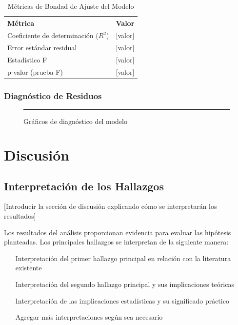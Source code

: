 \documentclass[12pt, letterpaper]{article}
\begin{document}
\begin{table}[H]
    \centering
    \caption{Métricas de Bondad de Ajuste del Modelo}
    \begin{tabular}{@{}lc@{}}
        \toprule
        \textbf{Métrica}                     & \textbf{Valor} \\
        \midrule
        Coeficiente de determinación ($R^2$) & [valor]        \\
        Error estándar residual              & [valor]        \\
        Estadístico F                        & [valor]        \\
        p-valor (prueba F)                   & [valor]        \\
        \bottomrule
    \end{tabular}
    \label{tab:bondad}
\end{table}

\subsubsection{Diagnóstico de Residuos}

\begin{figure}[H]
    \centering
    \rule{10cm}{6cm} %
    \caption{Gráficos de diagnóstico del modelo}
    \label{fig:residuos}
\end{figure}

\section{Discusión}

\subsection{Interpretación de los Hallazgos}

[Introducir la sección de discusión explicando cómo se interpretarán los resultados]

Los resultados del análisis proporcionan evidencia para evaluar las hipótesis planteadas. Los principales hallazgos se interpretan de la siguiente manera:

\begin{enumerate}
    \item [Interpretación del primer hallazgo principal en relación con la literatura existente]
    \item [Interpretación del segundo hallazgo principal y sus implicaciones teóricas]
    \item [Interpretación de las implicaciones estadísticas y su significado práctico]
    \item [Agregar más interpretaciones según sea necesario]
\end{enumerate}
\end{document}
